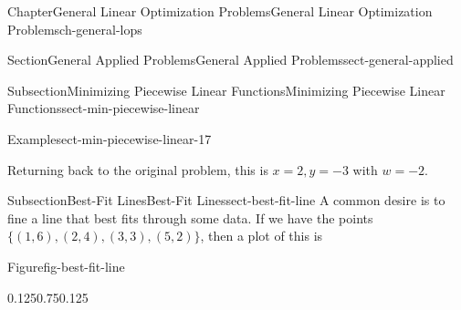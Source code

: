 \documentclass[oneside,10pt,]{book}
\numberwithin{equation}{section}
\begin{document}
\begin{chapterptx}{Chapter}{General Linear Optimization Problems}{}{General Linear Optimization Problems}{}{}{ch-general-lops}
\begin{sectionptx}{Section}{General Applied Problems}{}{General Applied Problems}{}{}{sect-general-applied}
\begin{subsectionptx}{Subsection}{Minimizing Piecewise Linear Functions}{}{Minimizing Piecewise Linear Functions}{}{}{sect-min-piecewise-linear}
\begin{example}{Example}{}{sect-min-piecewise-linear-17}
%
\par
Returning back to the original problem, this is \(x=2, y=-3\) with \(w=-2\).%
\end{example}
\end{subsectionptx}
%
%
\typeout{************************************************}
\typeout{************************************************}
%
\begin{subsectionptx}{Subsection}{Best-Fit Lines}{}{Best-Fit Lines}{}{}{sect-best-fit-line}
A common desire is to fine a line that best fits through some data.  If we have the points \(\{(1,6), (2,4), (3,3), (5,2)\}\), then a plot of this is%
\begin{figureptx}{Figure}{}{fig-best-fit-line}{}%
\begin{image}{0.125}{0.75}{0.125}{}%
\end{image}
\end{figureptx}
\end{subsectionptx}
\end{sectionptx}
\end{chapterptx}
\end{document}
